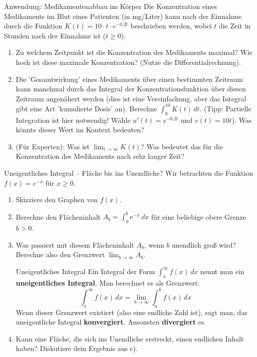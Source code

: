 \begin{aufgabenumgebung}{Anwendung: Medikamentenabbau im Körper}
Die Konzentration eines Medikaments im Blut eines Patienten (in mg/Liter) kann nach der Einnahme durch die Funktion $K(t) = 10 \cdot t \cdot e^{-0.2t}$ beschrieben werden, wobei $t$ die Zeit in Stunden nach der Einnahme ist ($t \ge 0$).
\begin{enumerate}
    \item Zu welchem Zeitpunkt ist die Konzentration des Medikaments maximal? Wie hoch ist diese maximale Konzentration? (Nutze die Differentialrechnung).
    \item Die 'Gesamtwirkung' eines Medikaments über einen bestimmten Zeitraum kann manchmal durch das Integral der Konzentrationsfunktion über diesen Zeitraum angenähert werden (dies ist eine Vereinfachung, aber das Integral gibt eine Art 'kumulierte Dosis' an).
        Berechne $\int_0^{10} K(t) \,dt$. (Tipp: Partielle Integration ist hier notwendig! Wähle $u'(t)=e^{-0.2t}$ und $v(t)=10t$).
        Was könnte dieser Wert im Kontext bedeuten?
    \item (Für Experten): Was ist $\lim_{t \to \infty} K(t)$? Was bedeutet das für die Konzentration des Medikaments nach sehr langer Zeit?
\end{enumerate}
\end{aufgabenumgebung}

\begin{aufgabenumgebung}{Uneigentliches Integral – Fläche bis ins Unendliche?}
Wir betrachten die Funktion $f(x) = e^{-x}$ für $x \ge 0$.
\begin{enumerate}
    \item Skizziere den Graphen von $f(x)$.
    \item Berechne den Flächeninhalt $A_b = \int_0^b e^{-x} \,dx$ für eine beliebige obere Grenze $b > 0$.
    \item Was passiert mit diesem Flächeninhalt $A_b$, wenn $b$ unendlich groß wird? Berechne also den Grenzwert $\lim_{b \to \infty} A_b$.
    \begin{tippumgebung}{Uneigentliches Integral}
    Ein Integral der Form $\int_a^\infty f(x) \,dx$ nennt man ein \textbf{uneigentliches Integral}. Man berechnet es als Grenzwert:
    \[ \int_a^\infty f(x) \,dx = \lim_{b \to \infty} \int_a^b f(x) \,dx \]
    Wenn dieser Grenzwert existiert (also eine endliche Zahl ist), sagt man, das uneigentliche Integral \textbf{konvergiert}. Ansonsten \textbf{divergiert} es.
    \end{tippumgebung}
    \item Kann eine Fläche, die sich ins Unendliche erstreckt, einen endlichen Inhalt haben? Diskutiere dein Ergebnis aus c).
\end{enumerate}
\end{aufgabenumgebung}



